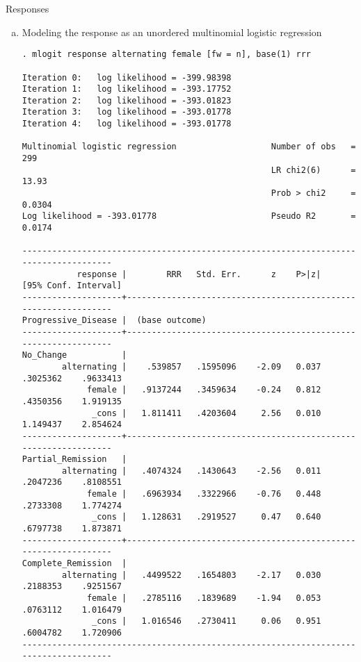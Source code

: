 \documentclass{article}
\begin{document}
Responses

\begin{enumerate}[a.]
\item Modeling the response as an unordered multinomial logistic regression

\begin{verbatim}
. mlogit response alternating female [fw = n], base(1) rrr

Iteration 0:   log likelihood = -399.98398  
Iteration 1:   log likelihood = -393.17752  
Iteration 2:   log likelihood = -393.01823  
Iteration 3:   log likelihood = -393.01778  
Iteration 4:   log likelihood = -393.01778  

Multinomial logistic regression                   Number of obs   =        299
                                                  LR chi2(6)      =      13.93
                                                  Prob > chi2     =     0.0304
Log likelihood = -393.01778                       Pseudo R2       =     0.0174

-------------------------------------------------------------------------------------
           response |        RRR   Std. Err.      z    P>|z|     [95% Conf. Interval]
--------------------+----------------------------------------------------------------
Progressive_Disease |  (base outcome)
--------------------+----------------------------------------------------------------
No_Change           |
        alternating |    .539857   .1595096    -2.09   0.037     .3025362    .9633413
             female |   .9137244   .3459634    -0.24   0.812     .4350356    1.919135
              _cons |   1.811411   .4203604     2.56   0.010     1.149437    2.854624
--------------------+----------------------------------------------------------------
Partial_Remission   |
        alternating |   .4074324   .1430643    -2.56   0.011     .2047236    .8108551
             female |   .6963934   .3322966    -0.76   0.448     .2733308    1.774274
              _cons |   1.128631   .2919527     0.47   0.640     .6797738    1.873871
--------------------+----------------------------------------------------------------
Complete_Remission  |
        alternating |   .4499522   .1654803    -2.17   0.030     .2188353    .9251567
             female |   .2785116   .1839689    -1.94   0.053     .0763112    1.016479
              _cons |   1.016546   .2730411     0.06   0.951     .6004782    1.720906
-------------------------------------------------------------------------------------
\end{verbatim}


\end{enumerate}
\end{document}
